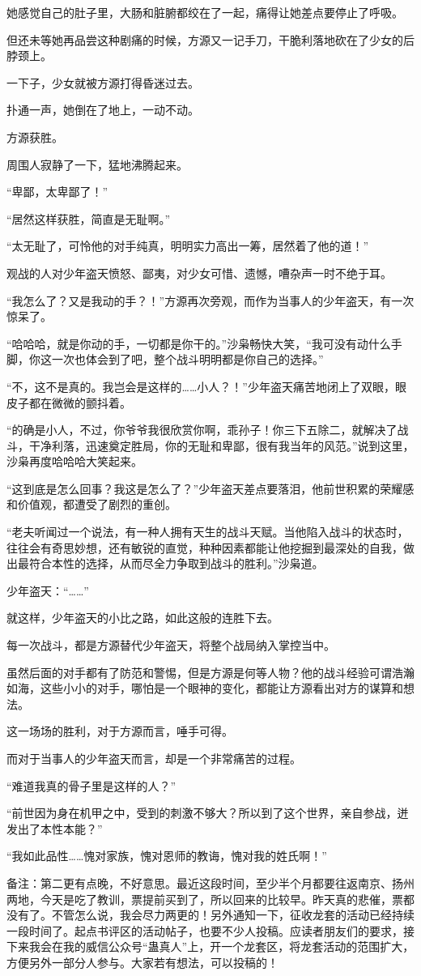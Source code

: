\begin{this_body}
她感觉自己的肚子里，大肠和脏腑都绞在了一起，痛得让她差点要停止了呼吸。

但还未等她再品尝这种剧痛的时候，方源又一记手刀，干脆利落地砍在了少女的后脖颈上。

一下子，少女就被方源打得昏迷过去。

扑通一声，她倒在了地上，一动不动。

方源获胜。

周围人寂静了一下，猛地沸腾起来。

“卑鄙，太卑鄙了！”

“居然这样获胜，简直是无耻啊。”

“太无耻了，可怜他的对手纯真，明明实力高出一筹，居然着了他的道！”

观战的人对少年盗天愤怒、鄙夷，对少女可惜、遗憾，嘈杂声一时不绝于耳。

“我怎么了？又是我动的手？！”方源再次旁观，而作为当事人的少年盗天，有一次惊呆了。

“哈哈哈，就是你动的手，一切都是你干的。”沙枭畅快大笑，“我可没有动什么手脚，你这一次也体会到了吧，整个战斗明明都是你自己的选择。”

“不，这不是真的。我岂会是这样的……小人？！”少年盗天痛苦地闭上了双眼，眼皮子都在微微的颤抖着。

“的确是小人，不过，你爷爷我很欣赏你啊，乖孙子！你三下五除二，就解决了战斗，干净利落，迅速奠定胜局，你的无耻和卑鄙，很有我当年的风范。”说到这里，沙枭再度哈哈哈大笑起来。

“这到底是怎么回事？我这是怎么了？”少年盗天差点要落泪，他前世积累的荣耀感和价值观，都遭受了剧烈的重创。

“老夫听闻过一个说法，有一种人拥有天生的战斗天赋。当他陷入战斗的状态时，往往会有奇思妙想，还有敏锐的直觉，种种因素都能让他挖掘到最深处的自我，做出最符合本性的选择，从而尽全力争取到战斗的胜利。”沙枭道。

少年盗天：“……”

就这样，少年盗天的小比之路，如此这般的连胜下去。

每一次战斗，都是方源替代少年盗天，将整个战局纳入掌控当中。

虽然后面的对手都有了防范和警惕，但是方源是何等人物？他的战斗经验可谓浩瀚如海，这些小小的对手，哪怕是一个眼神的变化，都能让方源看出对方的谋算和想法。

这一场场的胜利，对于方源而言，唾手可得。

而对于当事人的少年盗天而言，却是一个非常痛苦的过程。

“难道我真的骨子里是这样的人？”

“前世因为身在机甲之中，受到的刺激不够大？所以到了这个世界，亲自参战，迸发出了本性本能？”

“我如此品性……愧对家族，愧对恩师的教诲，愧对我的姓氏啊！”

备注：第二更有点晚，不好意思。最近这段时间，至少半个月都要往返南京、扬州两地，今天是吃了教训，票提前买到了，所以回来的比较早。昨天真的悲催，票都没有了。不管怎么说，我会尽力两更的！另外通知一下，征收龙套的活动已经持续一段时间了。起点书评区的活动帖子，也要不少人投稿。应读者朋友们的要求，接下来我会在我的威信公众号“蛊真人”上，开一个龙套区，将龙套活动的范围扩大，方便另外一部分人参与。大家若有想法，可以投稿的！

\end{this_body}

